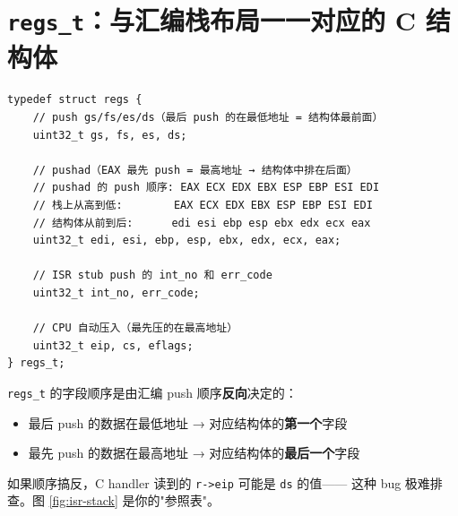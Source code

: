 \section{\texttt{regs\_t}：与汇编栈布局一一对应的 C 结构体}

\begin{lstlisting}[style=cstyle]
typedef struct regs {
    // push gs/fs/es/ds（最后 push 的在最低地址 = 结构体最前面）
    uint32_t gs, fs, es, ds;

    // pushad（EAX 最先 push = 最高地址 → 结构体中排在后面）
    // pushad 的 push 顺序: EAX ECX EDX EBX ESP EBP ESI EDI
    // 栈上从高到低:        EAX ECX EDX EBX ESP EBP ESI EDI
    // 结构体从前到后:      edi esi ebp esp ebx edx ecx eax
    uint32_t edi, esi, ebp, esp, ebx, edx, ecx, eax;

    // ISR stub push 的 int_no 和 err_code
    uint32_t int_no, err_code;

    // CPU 自动压入（最先压的在最高地址）
    uint32_t eip, cs, eflags;
} regs_t;
\end{lstlisting}

\begin{warnbox}
\texttt{regs\_t} 的字段顺序是由汇编 push 顺序\textbf{反向}决定的：
\begin{itemize}
  \item 最后 push 的数据在最低地址 → 对应结构体的\textbf{第一个}字段
  \item 最先 push 的数据在最高地址 → 对应结构体的\textbf{最后一个}字段
\end{itemize}
如果顺序搞反，C handler 读到的 \texttt{r->eip} 可能是 \texttt{ds} 的值——
这种 bug 极难排查。图 \ref{fig:isr-stack} 是你的"参照表"。
\end{warnbox}


